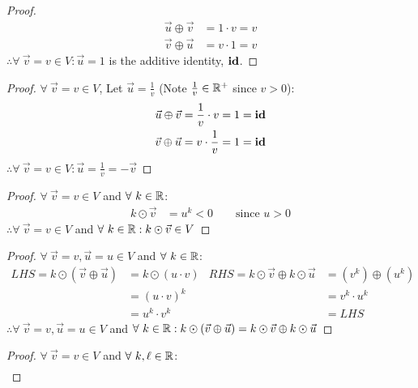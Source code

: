 \begin{enumerate}
\begin{proof}
    \begin{align*}
      \vec{u} \oplus \vec{v} & = 1 \cdot v = v \\
      \vec{v} \oplus \vec{u} & = v \cdot 1 = v
    \end{align*}
    $\therefore \forall~\vec{v} = v \in V: \vec{u} = 1$ is the additive identity, $\operatorname{\textbf{id}}$.
  \end{proof}
  \begin{proof}
    $\forall~\vec{v} = v \in V$, Let $\vec{u} = \frac{1}{v}$ (Note $\frac{1}{v} \in \mathbb{R}^+$ since $v > 0$):
    \begin{align*}
      \vec{u} \oplus \vec{v} & = \frac{1}{v} \cdot v = 1 = \operatorname{\textbf{id}} \\
      \vec{v} \oplus \vec{u} & = v \cdot \frac{1}{v} = 1 = \operatorname{\textbf{id}}
    \end{align*}
    $\therefore \forall~\vec{v} = v \in V: \vec{u} = \frac{1}{v} = -\vec{v}$
  \end{proof}
  \begin{proof}
    $\forall~\vec{v} = v \in V$ and $\forall~k \in \mathbb{R}$:
    \begin{align*}
      k \odot \vec{v} & = u^k < 0 \qquad \text{since $u>0$}
    \end{align*}
    $\therefore \forall~\vec{v} = v \in V$ and $\forall~k \in \mathbb{R}: k \odot \vec{v} \in V$
  \end{proof}
  \begin{proof}
    $\forall~\vec{v} = v,\vec{u} = u \in V$ and $\forall~k \in \mathbb{R}$:
    \begin{align*}
      LHS = k \odot (\vec{v} \oplus \vec{u}) & = k \odot (u \cdot v) & RHS = k \odot \vec{v} \oplus k \odot \vec{u} & = (v^k) \oplus (u^k) \\
                                             & = (u \cdot v)^k       &                                              & = v^k \cdot u^k      \\
                                             & = u^k \cdot v^k       &                                              & = LHS
    \end{align*}
    $\therefore \forall~\vec{v} = v,\vec{u} = u \in V$ and $\forall~k \in \mathbb{R}: k \odot (\vec{v} \oplus \vec{u}) = k \odot \vec{v} \oplus k \odot \vec{u}$
  \end{proof}
  \begin{proof}
    $\forall~\vec{v} = v \in V$ and $\forall~k,\ell \in \mathbb{R}$:
    \begin{align*}

\end{align*}
\end{proof}
\end{enumerate}
